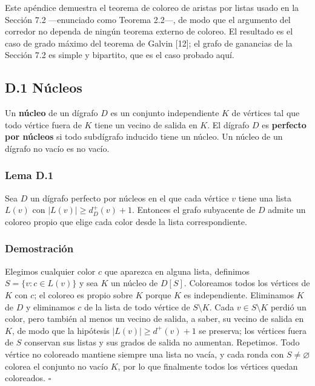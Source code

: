 \documentclass[
  11pt,
]{article}
\begin{document}
Este apéndice demuestra el teorema de coloreo de aristas por listas
usado en la Sección 7.2 ---enunciado como Teorema 2.2---, de modo que el
argumento del corredor no dependa de ningún teorema externo de coloreo.
El resultado es el caso de grado máximo del teorema de Galvin {[}12{]};
el grafo de ganancias de la Sección 7.2 es simple y bipartito, que es el
caso probado aquí.

\subsection{D.1 Núcleos}\label{d.1-nuxfacleos}

Un \textbf{núcleo} de un dígrafo \(D\) es un conjunto independiente
\(K\) de vértices tal que todo vértice fuera de \(K\) tiene un vecino de
salida en \(K\). El dígrafo \(D\) es \textbf{perfecto por núcleos} si
todo subdígrafo inducido tiene un núcleo. Un núcleo de un dígrafo no
vacío es no vacío.

\subsubsection{Lema D.1}\label{lema-d.1-lema-de-coloreo-por-nuxfacleos}

Sea \(D\) un dígrafo perfecto por núcleos en el que cada vértice \(v\)
tiene una lista \(L(v)\) con \(|L(v)|\ge d^+_D(v)+1\). Entonces el grafo
subyacente de \(D\) admite un coloreo propio que elige cada color desde
la lista correspondiente.

\subsubsection{Demostración}\label{demostraciuxf3n-7}

Elegimos cualquier color \(c\) que aparezca en alguna lista, definimos
\(S=\{v:c\in L(v)\}\) y sea \(K\) un núcleo de \(D[S]\). Coloreamos
todos los vértices de \(K\) con \(c\); el coloreo es propio sobre \(K\)
porque \(K\) es independiente. Eliminamos \(K\) de \(D\) y eliminamos
\(c\) de la lista de todo vértice de \(S\setminus K\). Cada
\(v\in S\setminus K\) perdió un color, pero también al menos un vecino
de salida, a saber, su vecino de salida en \(K\), de modo que la
hipótesis \(|L(v)|\ge d^+(v)+1\) se preserva; los vértices fuera de
\(S\) conservan sus listas y sus grados de salida no aumentan.
Repetimos. Todo vértice no coloreado mantiene siempre una lista no
vacía, y cada ronda con \(S\ne\varnothing\) colorea el conjunto no vacío
\(K\), por lo que finalmente todos los vértices quedan coloreados.
\(\square\)
\end{document}
